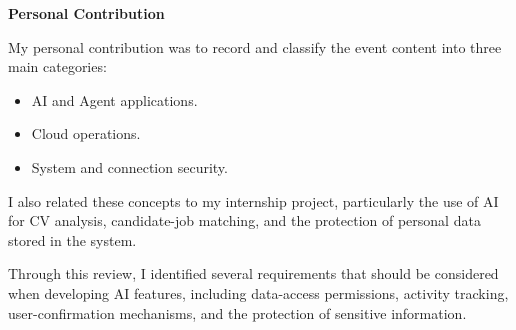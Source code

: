 \vspace{0.5em}\noindent\textbf{Personal Contribution}\par

My personal contribution was to record and classify the event content
into three main categories:

\begin{itemize}
\tightlist
\item
  AI and Agent applications.
\item
  Cloud operations.
\item
  System and connection security.
\end{itemize}

I also related these concepts to my internship project, particularly the
use of AI for CV analysis, candidate-job matching, and the protection of
personal data stored in the system.

Through this review, I identified several requirements that should be
considered when developing AI features, including data-access
permissions, activity tracking, user-confirmation mechanisms, and the
protection of sensitive information.
